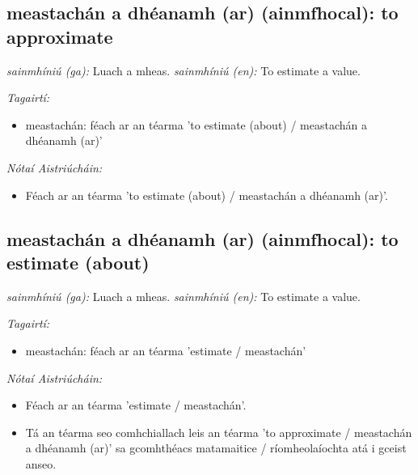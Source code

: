 \documentclass{article}
\begin{document}
\subsection*{meastachán a dhéanamh (ar) (ainmfhocal): to approximate} 
 \noindent \textit{sainmhíniú (ga):} Luach a mheas.
\newline\newline
 \noindent \textit{sainmhíniú (en):} To estimate a value.
\newline

 \noindent \textit{Tagairtí:}
\begin{itemize}
	\item meastachán: féach ar an téarma 'to estimate (about) / meastachán a dhéanamh (ar)'
\end{itemize}

 \noindent \textit{Nótaí Aistriúcháin:}
\begin{itemize}
	\item Féach ar an téarma 'to estimate (about) / meastachán a dhéanamh (ar)'.
\end{itemize}


\subsection*{meastachán a dhéanamh (ar) (ainmfhocal): to estimate (about)} 
 \noindent \textit{sainmhíniú (ga):} Luach a mheas.
\newline\newline
 \noindent \textit{sainmhíniú (en):} To estimate a value.
\newline

 \noindent \textit{Tagairtí:}
\begin{itemize}
	\item meastachán: féach ar an téarma 'estimate  / meastachán'
\end{itemize}

 \noindent \textit{Nótaí Aistriúcháin:}
\begin{itemize}
	\item Féach ar an téarma 'estimate / meastachán'.
	\item Tá an téarma seo comhchiallach leis an téarma 'to approximate / meastachán a dhéanamh (ar)' sa gcomhthéacs matamaitice / ríomheolaíochta atá i gceist anseo.
\end{itemize}
\end{document}
